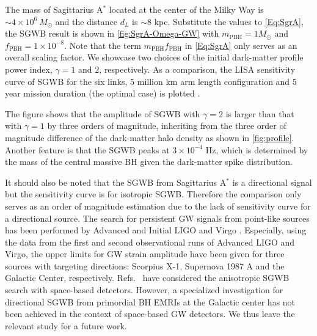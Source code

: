 The mass of  Sagittarius A$^\ast$ located at the center of the Milky Way is $\sim 4\times 10^6 ~M_\odot$ and the distance $d_L$ is $\sim 8$ kpc.
Substitute the values to \cref{Eq:SgrA}, the \ac{SGWB} result is shown in \cref{fig:SgrA-Omega-GW}  with $m_\text{PBH} = 1 M_\odot$ and $f_\text{PBH} = 1\times 10^{-8}$.
Note that the term $m_\text{PBH} f_\text{PBH}$ in \cref{Eq:SgrA} only serves as an overall scaling factor.
We showcase two choices of the  initial dark-matter profile power index, $\gamma=1$ and $2$, respectively.
As a comparison, the LISA sensitivity curve of \ac{SGWB} for the six links, 5 million km arm length configuration and 5 year mission duration (the optimal case) is plotted \cite{LISAscience-phase,LISAscience-inflation}.

The figure shows that the amplitude of \ac{SGWB} with $\gamma=2$ is larger than that with $\gamma=1$ by three orders of magnitude, inheriting from the three order of magnitude difference of the dark-matter halo density as shown in \cref{fig:profile}.
Another feature is that the \ac{SGWB} peaks at $3\times 10^{-4}$ Hz, which is determined by the mass of the central massive \ac{BH} given the dark-matter spike distribution.

It should also be noted that the \ac{SGWB} from Sagittarius A$^\ast$ is a directional signal but the sensitivity curve is for isotropic \ac{SGWB}.
Therefore the comparison only serves as an order of magnitude estimation due to the lack of sensitivity curve for a directional source.
The search for persistent \ac{GW} signals from point-like sources has been performed by Advanced \cite{directional1,directional2} and Initial  \cite{directional3} LIGO and Virgo . 
Especially, using the data from the first and second observational runs of Advanced LIGO and Virgo, the upper limits for \ac{GW} strain amplitude have been given for three sources with targeting directions: Scorpius X-1, Supernova 1987 A and the Galactic Center, respectively.
Refs.~\cite{space-ansgwb1, space-ansgwb2} have considered the anisotropic \ac{SGWB} search with space-based detectors.
However, a specialized investigation for directional \ac{SGWB} from primordial \ac{BH} \acp{EMRI} at the Galactic center has not been achieved in the context of space-based \ac{GW} detectors.
We thus leave the relevant study for a future work.



